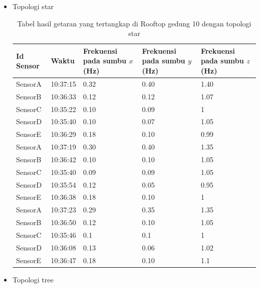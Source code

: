 \begin{itemize}
    \item Topologi star
    
    \begin{table}[H]
	\centering
	\caption{Tabel hasil getaran yang tertangkap di Rooftop gedung 10 dengan topologi star}
	\label{tree_paskal_tabel}
    	\begin{tabular}{|p{2cm}|p{2cm}|p{3cm}|p{3cm}|p{3cm}|}
    		\hline 
    		Id Sensor & Waktu & Frekuensi pada sumbu $x$ (Hz) & Frekuensi pada sumbu $y$ (Hz) & Frekuensi pada sumbu $z$ (Hz) \\
    		\hline
    		SensorA & 10:37:15 & 0.32 & 0.40 & 1.40 \\
    		\hline
    		SensorB & 10:36:33 & 0.12 & 0.12 & 1.07 \\
    		\hline
    		SensorC & 10:35:22 & 0.10 & 0.09 & 1 \\
    		\hline
    		SensorD & 10:35:40 & 0.10 & 0.07 & 1.05 \\
    		\hline
    		SensorE & 10:36:29 & 0.18 & 0.10 & 0.99 \\
    		\hline
    		SensorA & 10:37:19 & 0.30 & 0.40 & 1.35 \\
    		\hline
    		SensorB & 10:36:42 & 0.10 & 0.10 & 1.05 \\
    		\hline
    		SensorC & 10:35:40 & 0.09 & 0.09 & 1.05 \\
    		\hline
    		SensorD & 10:35:54 & 0.12 & 0.05 & 0.95 \\
    		\hline
    		SensorE & 10:36:38 & 0.18 & 0.10 & 1 \\
    		\hline
    		SensorA & 10:37:23 & 0.29 & 0.35 & 1.35 \\
    		\hline
    		SensorB & 10:36:50 & 0.12 & 0.10 & 1.05 \\
    		\hline
    		SensorC & 10:35:46 & 0.1 & 0.1 & 1 \\
    		\hline
    		SensorD & 10:36:08 & 0.13 & 0.06 & 1.02 \\
    		\hline
    		SensorE & 10:36:47 & 0.18 & 0.10 & 1.1 \\
    		\hline
    	\end{tabular}
    \end{table}
    
    \item Topologi tree
    

\end{itemize}
